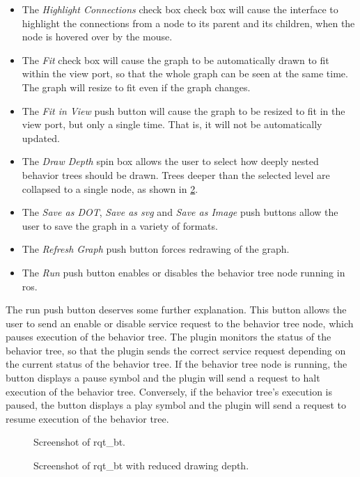 \documentclass[\rootfolder/main.tex]{subfiles}
\begin{document}
\begin{itemize}
\item The \emph{Highlight Connections} check box check box will cause the interface to highlight the connections from a node to its parent and its children, when the node is hovered over by the mouse.
\item The \emph{Fit} check box will cause the graph to be automatically drawn to fit within the view port, so that the whole graph can be seen at the same time. The graph will resize to fit even if the graph changes.
\item The \emph{Fit in View} push button will cause the graph to be resized to fit in the view port, but only a single time. That is, it will not be automatically updated.
\item The \emph{Draw Depth} spin box allows the user to select how deeply nested behavior trees should be drawn. Trees deeper than the selected level are collapsed to a single node, as shown in \cref{fig:rqt-bt-depth}.
\item The \emph{Save as DOT}, \emph{Save as \acrshort{svg}} and \emph{Save as Image} push buttons allow the user to save the graph in a variety of formats.
\item The \emph{Refresh Graph} push button forces redrawing of the graph.
\item The \emph{Run} push button enables or disables the behavior tree node running in \acrshort{ros}.
\end{itemize}

The run push button deserves some further explanation.
This button allows the user to send an enable or disable service request to the behavior tree node, which pauses execution of the behavior tree.
The plugin monitors the status of the behavior tree, so that the plugin sends the correct service request depending on the current status of the behavior tree.
If the behavior tree node is running, the button displays a pause symbol and the plugin will send a request to halt execution of the behavior tree.
Conversely, if the behavior tree's execution is paused, the button displays a play symbol and the plugin will send a request to resume execution of the behavior tree.

\begin{figure}[ht]
    \caption{Screenshot of rqt\_bt.}
    \label{fig:rqt-bt}
\end{figure}

\begin{figure}[ht]
    \caption{Screenshot of rqt\_bt with reduced drawing depth.}
    \label{fig:rqt-bt-depth}
\end{figure}
\end{document}
